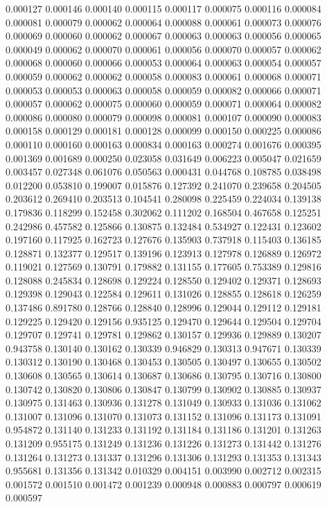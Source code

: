 0.000127
0.000146
0.000140
0.000115
0.000117
0.000075
0.000116
0.000084
0.000081
0.000079
0.000062
0.000064
0.000088
0.000061
0.000073
0.000076
0.000069
0.000060
0.000062
0.000067
0.000063
0.000063
0.000056
0.000065
0.000049
0.000062
0.000070
0.000061
0.000056
0.000070
0.000057
0.000062
0.000068
0.000060
0.000066
0.000053
0.000064
0.000063
0.000054
0.000057
0.000059
0.000062
0.000062
0.000058
0.000083
0.000061
0.000068
0.000071
0.000053
0.000053
0.000063
0.000058
0.000059
0.000082
0.000066
0.000071
0.000057
0.000062
0.000075
0.000060
0.000059
0.000071
0.000064
0.000082
0.000086
0.000080
0.000079
0.000098
0.000081
0.000107
0.000090
0.000083
0.000158
0.000129
0.000181
0.000128
0.000099
0.000150
0.000225
0.000086
0.000110
0.000160
0.000163
0.000834
0.000163
0.000274
0.001676
0.000395
0.001369
0.001689
0.000250
0.023058
0.031649
0.006223
0.005047
0.021659
0.003457
0.027348
0.061076
0.050563
0.000431
0.044768
0.108785
0.038498
0.012200
0.053810
0.199007
0.015876
0.127392
0.241070
0.239658
0.204505
0.203612
0.269410
0.203513
0.104541
0.280098
0.225459
0.224034
0.139138
0.179836
0.118299
0.152458
0.302062
0.111202
0.168504
0.467658
0.125251
0.242986
0.457582
0.125866
0.130875
0.132484
0.534927
0.122431
0.123602
0.197160
0.117925
0.162723
0.127676
0.135903
0.737918
0.115403
0.136185
0.128871
0.132377
0.129517
0.139196
0.123913
0.127978
0.126889
0.126972
0.119021
0.127569
0.130791
0.179882
0.131155
0.177605
0.753389
0.129816
0.128088
0.245834
0.128698
0.129224
0.128550
0.129402
0.129371
0.128693
0.129398
0.129043
0.122584
0.129611
0.131026
0.128855
0.128618
0.126259
0.137486
0.891780
0.128766
0.128840
0.128996
0.129044
0.129112
0.129181
0.129225
0.129420
0.129156
0.935125
0.129470
0.129644
0.129504
0.129704
0.129707
0.129741
0.129781
0.129862
0.130157
0.129936
0.129889
0.130207
0.943758
0.130140
0.130162
0.130339
0.946829
0.130313
0.947671
0.130339
0.130312
0.130190
0.130468
0.130453
0.130505
0.130497
0.130655
0.130502
0.130608
0.130565
0.130614
0.130687
0.130686
0.130795
0.130716
0.130800
0.130742
0.130820
0.130806
0.130847
0.130799
0.130902
0.130885
0.130937
0.130975
0.131463
0.130936
0.131278
0.131049
0.130933
0.131036
0.131062
0.131007
0.131096
0.131070
0.131073
0.131152
0.131096
0.131173
0.131091
0.954872
0.131140
0.131233
0.131192
0.131184
0.131186
0.131201
0.131263
0.131209
0.955175
0.131249
0.131236
0.131226
0.131273
0.131442
0.131276
0.131264
0.131273
0.131337
0.131296
0.131306
0.131293
0.131353
0.131343
0.955681
0.131356
0.131342
0.010329
0.004151
0.003990
0.002712
0.002315
0.001572
0.001510
0.001472
0.001239
0.000948
0.000883
0.000797
0.000619
0.000597
